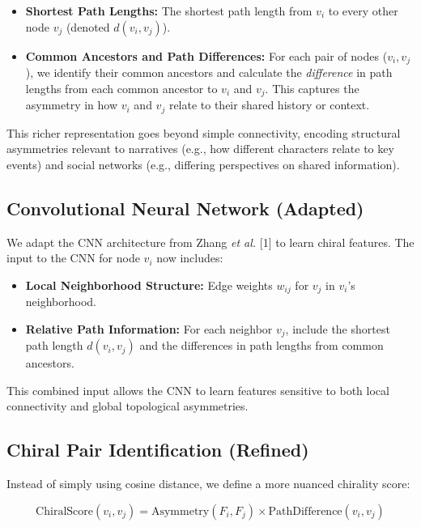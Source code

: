 \documentclass[12pt, a4paper]{article}
\begin{document}
\begin{itemize}
    \item \textbf{Shortest Path Lengths:} The shortest path length from $v_i$ to every other node $v_j$ (denoted $d(v_i, v_j)$).
    \item \textbf{Common Ancestors and Path Differences:} For each pair of nodes ($v_i, v_j$), we identify their common ancestors and calculate the \textit{difference} in path lengths from each common ancestor to $v_i$ and $v_j$. This captures the asymmetry in how $v_i$ and $v_j$ relate to their shared history or context.
\end{itemize}

This richer representation goes beyond simple connectivity, encoding structural asymmetries relevant to narratives (e.g., how different characters relate to key events) and social networks (e.g., differing perspectives on shared information).

\subsection{Convolutional Neural Network (Adapted)}

We adapt the CNN architecture from Zhang \textit{et al.} [1] to learn chiral features. The input to the CNN for node $v_i$ now includes:

\begin{itemize}
    \item \textbf{Local Neighborhood Structure:} Edge weights $w_{ij}$ for $v_j$ in $v_i$'s neighborhood.
    \item \textbf{Relative Path Information:} For each neighbor $v_j$, include the shortest path length $d(v_i, v_j)$ and the differences in path lengths from common ancestors.
\end{itemize}

This combined input allows the CNN to learn features sensitive to both local connectivity and global topological asymmetries.

\subsection{Chiral Pair Identification (Refined)}

Instead of simply using cosine distance, we define a more nuanced chirality score:

\begin{equation}
\text{ChiralScore}(v_i, v_j) = \text{Asymmetry}(F_i, F_j) \times \text{PathDifference}(v_i, v_j)
\end{equation}
\end{document}
